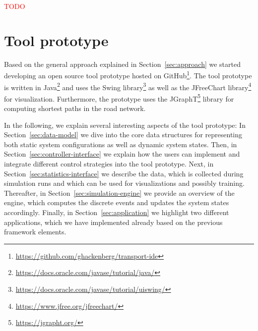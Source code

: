 \documentclass[10pt,twocolumn]{article}
\begin{document}
\textcolor{red}{TODO}

\section{Tool prototype}
\label{sec:tool-prototype}

Based on the general approach explained in Section~\ref{sec:approach} we started developing an open source tool prototype hosted on GitHub\footnote{\url{https://github.com/ghackenberg/transport-ide}}.
The tool prototype is written in Java\footnote{\url{https://docs.oracle.com/javase/tutorial/java/}} and uses the Swing library\footnote{\url{https://docs.oracle.com/javase/tutorial/uiswing/}} as well as the JFreeChart library\footnote{\url{https://www.jfree.org/jfreechart/}} for visualization.
Furthermore, the prototype uses the JGraphT\footnote{\url{https://jgrapht.org/}} library for computing shortest paths in the road network.

In the following, we explain several interesting aspects of the tool prototype:
In Section~\ref{sec:data-model} we dive into the core data structures for representing both static system configurations as well as dynamic system states.
Then, in Section~\ref{sec:controller-interface} we explain how the users can implement and integrate different control strategies into the tool prototype.
Next, in Section~\ref{sec:statistics-interface} we describe the data, which is collected during simulation runs and which can be used for visualizations and possibly training.
Thereafter, in Section~\ref{sec:simulation-engine} we provide an overview of the engine, which computes the discrete events and updates the system states accordingly.
Finally, in Section~\ref{sec:application} we highlight two different applications, which we have implemented already based on the previous framework elements.



\end{document}
